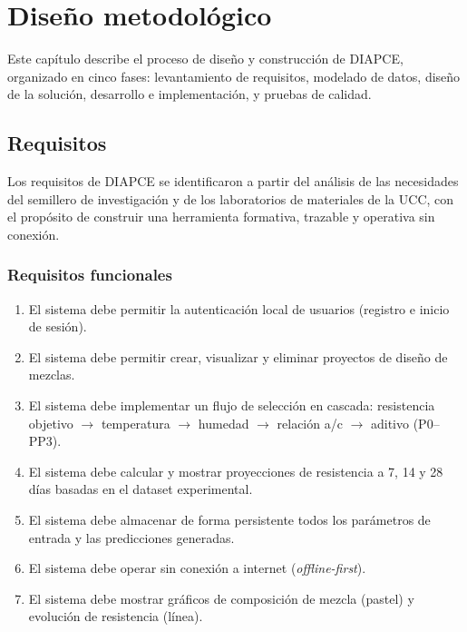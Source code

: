 \section{Diseño metodológico}

Este capítulo describe el proceso de diseño y construcción de DIAPCE, organizado en cinco fases: levantamiento de requisitos, modelado de datos, diseño de la solución, desarrollo e implementación, y pruebas de calidad.

\subsection{Requisitos}

Los requisitos de DIAPCE se identificaron a partir del análisis de las necesidades del semillero de investigación y de los laboratorios de materiales de la UCC, con el propósito de construir una herramienta formativa, trazable y operativa sin conexión.

\subsubsection*{Requisitos funcionales}
\begin{enumerate}
    \item El sistema debe permitir la autenticación local de usuarios (registro e inicio de sesión).
    \item El sistema debe permitir crear, visualizar y eliminar proyectos de diseño de mezclas.
    \item El sistema debe implementar un flujo de selección en cascada: resistencia objetivo $\rightarrow$ temperatura $\rightarrow$ humedad $\rightarrow$ relación a/c $\rightarrow$ aditivo (P0--PP3).
    \item El sistema debe calcular y mostrar proyecciones de resistencia a 7, 14 y 28 días basadas en el dataset experimental.
    \item El sistema debe almacenar de forma persistente todos los parámetros de entrada y las predicciones generadas.
    \item El sistema debe operar sin conexión a internet (\textit{offline-first}).
    \item El sistema debe mostrar gráficos de composición de mezcla (pastel) y evolución de resistencia (línea).
\end{enumerate}

